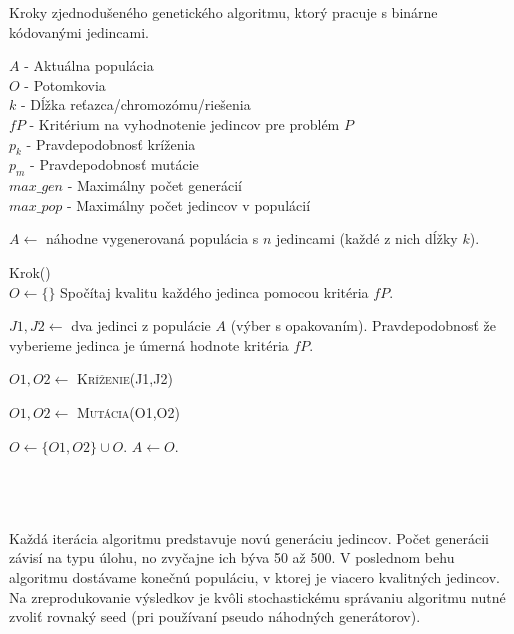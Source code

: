 \begin{algorithm}
\caption{Kroky zjednodušeného genetického algoritmu, ktorý pracuje s binárne kódovanými jedincami.}\label{fig:geneticAlgoritm}
$A$ - Aktuálna populácia \\
$O$ - Potomkovia \\
$k$ - Dĺžka reťazca/chromozómu/riešenia \\
$fP$ - Kritérium na vyhodnotenie jedincov pre problém $P$\\
$p_{k}$ - Pravdepodobnosť kríženia \\
$p_{m}$ - Pravdepodobnosť mutácie \\
$max\_gen$ - Maximálny počet generácií \\
$max\_pop$ - Maximálny počet jedincov v populácií \\
\begin{algorithmic}

\State \parbox[t]{400pt}{$A \gets $ náhodne vygenerovaná populácia s $n$ jedincami (každé z nich dĺžky $k$).}

	\State Krok()
\EndFor
\\
	\State $O \gets \{\}$
	\State Spočítaj kvalitu každého jedinca pomocou kritéria $fP$.	
		\State \parbox[t]{350pt}{$J1,J2 \gets $ dva jedinci z populácie $A$ (výber s opakovaním). Pravdepodobnosť že vyberieme jedinca je úmerná hodnote kritéria $fP$.}
		\State \parbox[t]{350pt}{$O1,O2 \gets $ \textsc{Kríženie(J1,J2)}}
		\State \parbox[t]{350pt}{$O1,O2 \gets $ \textsc{Mutácia(O1,O2)}}
		\State $O \gets \{O1,O2\} \cup O$.
	\EndWhile
	\State $A \gets O$.
\EndProcedure
\\
 \\
\EndFunction
\\
 \\
\EndFunction
\end{algorithmic}
\end{algorithm}
Každá iterácia algoritmu predstavuje novú generáciu jedincov. Počet generácii závisí na typu úlohu, no zvyčajne ich býva 50 až 500. V poslednom behu algoritmu dostávame konečnú populáciu, v ktorej je viacero kvalitných jedincov. Na zreprodukovanie výsledkov je kvôli stochastickému správaniu algoritmu nutné zvoliť rovnaký seed (pri používaní pseudo náhodných generátorov). 

